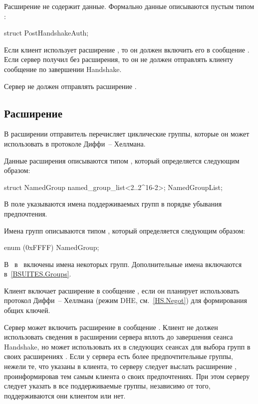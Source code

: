 Расширение  не содержит данные. Формально данные 
описываются пустым типом : 

\begin{codeblock}
struct {} PostHandshakeAuth;
\end{codeblock}

Если клиент использует расширение , то он должен 
включить его в сообщение .
%
Если сервер получил  без расширения, то он
не должен отправлять клиенту сообщение  
по завершении Handshake. 

Сервер не должен отправлять расширение .

\subsection{Расширение }\label{HS.Ext.sg} 

В расширении  отправитель перечисляет циклические 
группы, которые он может использовать в протоколе Диффи~-- Хеллмана.

Данные расширения  описываются типом 
, который определяется следующим образом: 
%
\begin{codeblock}
struct {
  NamedGroup named_group_list<2..2^16-2>;
} NamedGroupList;
\end{codeblock}


В поле  указываются имена поддерживаемых групп
в порядке убывания предпочтения.

Имена групп описываются типом , который определяется 
следующим образом:

\begin{codeblock}
enum { (0xFFFF) } NamedGroup;
\end{codeblock}

В~\cite{RFC8446} в~ включены имена некоторых групп. 
Дополнительные имена включаются в~\ref{BSUITES.Groups}. 

Клиент включает расширение  в сообщение 
, если он планирует использовать протокол 
Диффи~-- Хеллмана (режим DHE, см.~\ref{HS.Negot}) для формирования общих 
ключей.

Сервер может включить расширение  в сообщение
. Клиент не должен использовать сведения
в расширении сервера вплоть до завершения сеанса Handshake, но может использовать 
их в следующих сеансах для выбора групп в своих расширениях 
.
%
Если у сервера есть более предпочтительные группы, нежели те, что указаны в  
 клиента, то серверу следует выслать 
расширение , проинформировав тем самым клиента о своих 
предпочтениях. При этом серверу следует указать в  все 
поддерживаемые группы, независимо от того, поддерживаются они клиентом или нет. 

